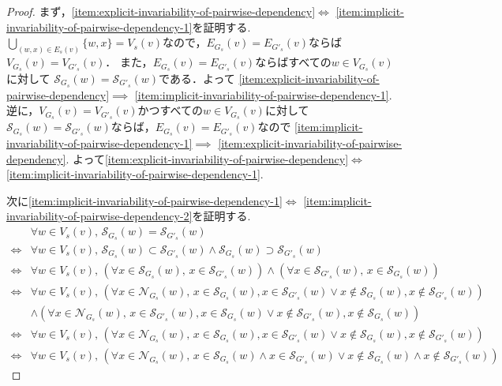 \begin{proof}
  まず，\ref{item:explicit-invariability-of-pairwise-dependency}$\iff$
  \ref{item:implicit-invariability-of-pairwise-dependency-1}を証明する.
  $\bigcup_{(w,x)\in E_s(v)}\{w,x\}=V_s(v)$なので，$E_{G_s}(v)=E_{G'_s}(v)$ならば$V_{G_s}(v)=V_{G'_s}(v)$．
  また，$E_{G_s}(v)=E_{G'_s}(v)$ならばすべての$w\in V_{G_s}(v)$に対して
  $\mathcal{S}_{G_s}(w)=\mathcal{S}_{G'_s}(w)$である．よって
  \ref{item:explicit-invariability-of-pairwise-dependency}$\implies$
  \ref{item:implicit-invariability-of-pairwise-dependency-1}.
  逆に，$V_{G_s}(v)=V_{G'_s}(v)$かつすべての$w\in V_{G_s}(v)$に対して
  $\mathcal{S}_{G_s}(w)=\mathcal{S}_{G'_s}(w)$ならば，$E_{G_s}(v)=E_{G'_s}(v)$なので
  \ref{item:implicit-invariability-of-pairwise-dependency-1}$\implies$
  \ref{item:explicit-invariability-of-pairwise-dependency}.
  よって\ref{item:explicit-invariability-of-pairwise-dependency}$\iff$
  \ref{item:implicit-invariability-of-pairwise-dependency-1}.

  次に\ref{item:implicit-invariability-of-pairwise-dependency-1}$\iff$
  \ref{item:implicit-invariability-of-pairwise-dependency-2}を証明する.
  \begin{equation*}
    \begin{aligned}
      &\forall w\in V_s(v),\,\mathcal{S}_{G_s}(w)=\mathcal{S}_{G'_s}(w)\\
      \iff&\forall w\in V_s(v),\,\mathcal{S}_{G_s}(w)\subset\mathcal{S}_{G'_s}(w)
      \land\mathcal{S}_{G_s}(w)\supset\mathcal{S}_{G'_s}(w)\\
      \iff&\forall w\in V_s(v),\,\left(\forall x\in\mathcal{S}_{G_s}(w),\,x\in\mathcal{S}_{G'_s}(w)\right)
      \land\left(\forall x\in\mathcal{S}_{G'_s}(w),\,x\in\mathcal{S}_{G_s}(w)\right)\\
      \iff&\forall w\in V_s(v),\,\left(\forall x\in\mathcal{N}_{G_s}(w),\,
      x\in\mathcal{S}_{G_s}(w),x\in\mathcal{S}_{G'_s}(w)
      \lor x\notin\mathcal{S}_{G_s}(w),x\notin\mathcal{S}_{G'_s}(w)\right)\\
      &\land\left(\forall x\in\mathcal{N}_{G_s}(w),\,
      x\in\mathcal{S}_{G'_s}(w),x\in\mathcal{S}_{G_s}(w)
      \lor x\notin\mathcal{S}_{G'_s}(w),x\notin\mathcal{S}_{G_s}(w)\right)\\
      \iff&\forall w\in V_s(v),\,\left(\forall x\in\mathcal{N}_{G_s}(w),\,
      x\in\mathcal{S}_{G_s}(w),x\in\mathcal{S}_{G'_s}(w)
      \lor x\notin\mathcal{S}_{G_s}(w),x\notin\mathcal{S}_{G'_s}(w)\right)\\
      \iff&\forall w\in V_s(v),\,\left(\forall x\in\mathcal{N}_{G_s}(w),\,
      x\in\mathcal{S}_{G_s}(w)\land x\in\mathcal{S}_{G'_s}(w)
      \lor x\notin\mathcal{S}_{G_s}(w)\land x\notin\mathcal{S}_{G'_s}(w)\right)
    \end{aligned}
  \end{equation*}
\end{proof}

